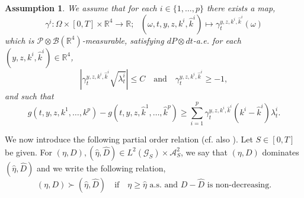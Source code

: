 \documentclass[11pt,a4paper]{article}
\numberwithin{equation}{section}
\theoremstyle{newPlain}
\theoremstyle{newDefinition}
\newtheorem{assumption}{Assumption}[theorem]
\theoremstyle{newRemark}
\newtheorem{remark}[theorem]{Remark}
\begin{document}
 \begin{assumption}\label{assumption:JumpPricingSystemMap}
     We assume that for each $i\in\{1,\ldots,p\}$ there exists a map,
     \begin{equation*}
         \gamma^i:\Omega\times[0,T]\times\mathbb{R}^4\rightarrow\mathbb{R};\text{  }(\omega,t,y,z,k^i,\hat{k}^i)\mapsto\gamma_t^{y,z,k^i,\hat{k}^i}(\omega)
     \end{equation*}
     which is $\mathcal{P}\otimes\mathcal{B}(\mathbb{R}^4)$-measurable, satisfying $dP\otimes dt$-a.e. for each $(y,z,k^i,\hat{k}^i)\in\mathbb{R}^4$,
     \begin{equation}\label{eq:3_MapCondition1}
         \left|\gamma_t^{y,z,k^i,\hat{k}^i}\sqrt{\lambda_t^i}\right|\le C\quad\text{and}\quad\gamma_t^{y,z,k^i,\hat{k}^i}\ge-1,
     \end{equation}
     and such that
     \begin{equation}\label{eq:3_MapCondition2}
         g(t,y,z,k^1,\ldots,k^p) - g(t,y,z,\hat{k}^1,\ldots,\hat{k}^p) \ge \sum_{i=1}^p\gamma_t^{y,z,k^i,\hat{k}^i}(k^i-\hat{k}^i)\lambda_t^i.
     \end{equation}
 \end{assumption}


 We now introduce the following partial order relation (cf. also \cite{dumitrescu2018bsdes}). Let $S\in[0,T]$ be given. For $(\eta,D),(\hat{\eta},\hat{D})\in L^2(\mathcal{G}_S)\times\mathcal{A}_S^2$, we say that $(\eta,D)$ dominates $(\hat{\eta},\hat{D})$ and we write the following relation,
 \begin{equation*}
    (\eta,D)\succ(\hat{\eta},\hat{D})\quad \text{if}\quad \eta\ge\hat{\eta}\text{ a.s.  and }D - \hat{D}\text{ is non-decreasing}.
 \end{equation*}
\end{document}
